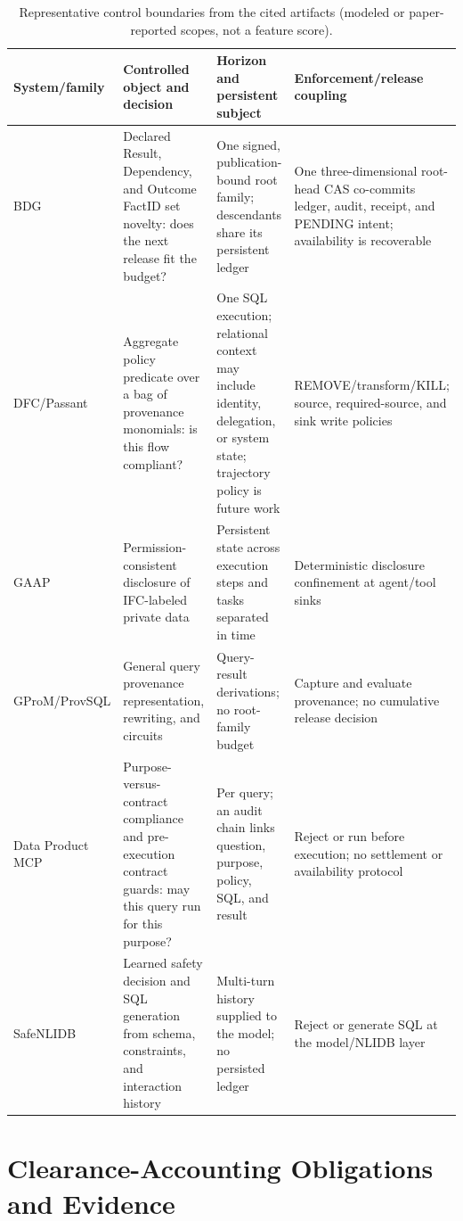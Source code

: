 \documentclass[journal,onecolumn]{IEEEtran}
\begin{document}
\begin{table}[h]
\centering
\caption{Representative control boundaries from the cited artifacts (modeled
or paper-reported scopes, not a feature score).}
\label{tab:system-comparison}
\scriptsize
\setlength{\tabcolsep}{2pt}
\renewcommand{\arraystretch}{1.0}
\begin{tabular}{L{0.13\textwidth}L{0.27\textwidth}L{0.25\textwidth}L{0.25\textwidth}}
\toprule
System/family & Controlled object and decision & Horizon and persistent subject & Enforcement/release coupling \\
\midrule
BDG & Declared Result, Dependency, and Outcome FactID set novelty:
does the next release fit the budget? & One signed, publication-bound root
family; descendants share its persistent ledger & One three-dimensional
root-head CAS co-commits ledger, audit, receipt, and PENDING intent; availability
is recoverable \\
DFC/Passant & Aggregate policy
predicate over a bag of provenance monomials: is this flow compliant? & One
SQL execution; relational context may include identity, delegation, or system
state; trajectory policy is future work & REMOVE/transform/KILL; source,
required-source, and sink write policies \\
GAAP & Permission-consistent disclosure of IFC-labeled
private data & Persistent state across execution steps and tasks separated in
time & Deterministic disclosure confinement at agent/tool sinks \\
GProM/ProvSQL & General query provenance representation, rewriting, and circuits & Query-result
derivations; no root-family budget & Capture and evaluate provenance; no
cumulative release decision \\
Data Product MCP & Purpose-versus-contract
compliance and pre-execution contract guards: may this query run for this
purpose? & Per query; an audit chain links question, purpose, policy, SQL, and
result & Reject or run before execution; no settlement or availability
protocol \\
SafeNLIDB & Learned safety decision and SQL generation
from schema, constraints, and interaction history & Multi-turn history
supplied to the model; no persisted ledger & Reject or generate SQL at the
model/NLIDB layer \\
\bottomrule
\end{tabular}
\end{table}

\section{Clearance-Accounting Obligations and Evidence}
\label{sec:supp-clearance-accounting}
\end{document}
